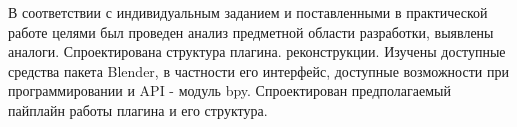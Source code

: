 
В соответствии с индивидуальным заданием и поставленными в
практической работе целями был проведен анализ предметной области
разработки, выявлены аналоги. Спроектирована структура плагина.
реконструкции. Изучены доступные средства пакета Blender, в частности его интерфейс, доступные возможности при программировании и API - модуль bpy.  Спроектирован предполагаемый пайплайн работы плагина и его структура.


\clearpage
